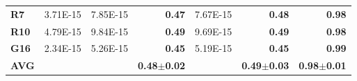 \documentclass[encoding=utf8,british]{tumphthesis}
\begin{document}
\begin{table}[H]
\begin{subtable}{1.0\textwidth}
{\begin{tabular}{|l|llr|lr|r|}
\rowcolor[HTML]{CFE2F3} 
\textbf{R7}                               & 3.71E-15                                             & 7.85E-15                                              & \textbf{0.47}                                    & 7.67E-15                                                       & \textbf{0.48}                                    & \textbf{0.98}                                            \\
\textbf{R10}                              & 4.79E-15                                             & 9.84E-15                                              & \textbf{0.49}                                    & 9.69E-15                                                       & \textbf{0.49}                                    & \textbf{0.98}                                            \\
\rowcolor[HTML]{CFE2F3} 
\textbf{G16}                              & 2.34E-15                                             & 5.26E-15                                              & \textbf{0.45}                                    & 5.19E-15                                                       & \textbf{0.45}                                    & \textbf{0.99}                                            \\ \hline
\textbf{AVG}                             &                                                      &                                                       & \textbf{0.48$\pm$0.02}                           &                                                                & \textbf{0.49$\pm$0.03}                           & \textbf{0.98$\pm$0.01}                                  
 \\ \hline
\end{tabular}}
    \end{subtable}

    \bigskip

    \hfill


\end{table}
\end{document}
